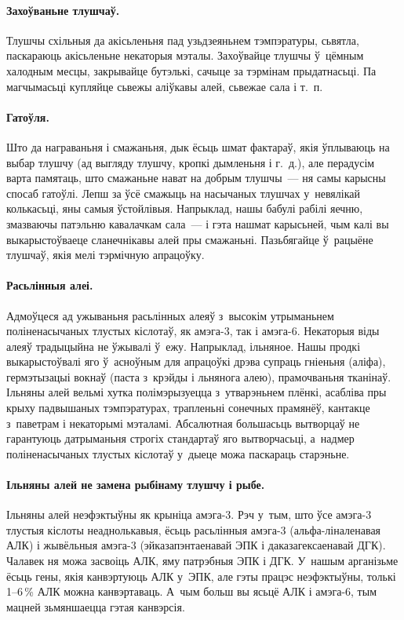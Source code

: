\paragraph{Захоўваньне тлушчаў.}
Тлушчы схільныя да акісьленьня пад узьдзеяньнем тэмпэратуры, сьвятла, паскараюць акісьленьне некаторыя мэталы. Захоўвайце тлушчы ў~цёмным халодным месцы, закрывайце бутэлькі, сачыце за тэрмінам прыдатнасьці. Па магчымасьці купляйце сьвежы аліўкавы алей, сьвежае сала і т.~п.

\paragraph{Гатоўля.}
Што да награваньня і смажаньня, дык ёсьць шмат фактараў, якія ўплываюць на выбар тлушчу (ад выгляду тлушчу, кропкі дымленьня і г.~д.), але перадусім варта памятаць, што смажаньне нават на добрым тлушчы~--- ня самы карысны спосаб гатоўлі. Лепш за ўсё смажыць на насычаных тлушчах у~невялікай колькасьці, яны самыя ўстойлівыя. Напрыклад, нашы бабулі рабілі яечню, змазваючы патэльню кавалачкам сала~--- і гэта нашмат карысьней, чым калі вы выкарыстоўваеце сланечнікавы алей пры смажаньні. Пазьбягайце ў~рацыёне тлушчаў, якія мелі тэрмічную апрацоўку.

\paragraph{Расьлінныя алеі.}
Адмоўцеся ад ужываньня расьлінных алеяў з~высокім утрыманьнем поліненасычаных тлустых кіслотаў, як амэга-3, так і амэга-6. Некаторыя віды алеяў традыцыйна не ўжывалі ў~ежу. Напрыклад, ільняное. Нашы продкі выкарыстоўвалі яго ў~асноўным для апрацоўкі дрэва супраць гніеньня (аліфа), гермэтызацыі вокнаў (паста з~крэйды і льнянога алею), прамочваньня тканінаў. Ільняны алей вельмі хутка полімэрызуецца з~утварэньнем плёнкі, асабліва пры крыху падвышаных тэмпэратурах, трапленьні сонечных прамянёў, кантакце з~паветрам і некаторымі мэталамі. Абсалютная большасьць вытворцаў не гарантуюць датрыманьня строгіх стандартаў яго вытворчасьці, а~надмер поліненасычаных тлустых кіслотаў у~дыеце можа паскараць старэньне.


\paragraph{Ільняны алей не замена рыбінаму тлушчу і рыбе.}
Ільняны алей неэфэктыўны як крыніца амэга-3. Рэч у~тым, што ўсе амэга-3 тлустыя кіслоты неаднолькавыя, ёсьць расьлінныя амэга-3 (альфа-ліналенавая АЛК) і жывёльныя амэга-3 (эйказапэнтаенавай ЭПК і даказагексаенавай ДГК). Чалавек ня можа засвоіць АЛК, яму патрэбныя ЭПК і ДГК. У~нашым арганізьме ёсьць гены, якія канвэртуюць АЛК у~ЭПК, але гэты працэс неэфэктыўны, толькі 1--6\,\% АЛК можна канвэртаваць. А~чым больш вы ясьцё АЛК і амэга-6, тым мацней зьмяншаецца гэтая канвэрсія.

